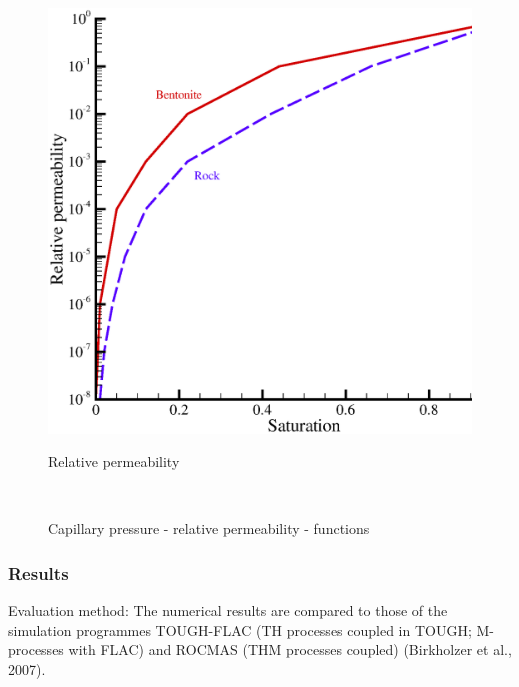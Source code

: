 \begin{figure}[!htb]
\begin{center}
\begin{minipage}[t]{0.45\textwidth}
\begin{center}
        \includegraphics[scale=0.3]{THM/persat.eps}\\
        \centerline{Relative permeability}
      \end{center}
    \end{minipage}\\
  \end{center}
  \caption{Capillary pressure - relative permeability - functions}
  \label{fig:cp_rp}
\end{figure}

\subsubsection*{Results}

Evaluation method: The numerical results are compared to those of the simulation programmes TOUGH-FLAC (TH processes coupled in TOUGH; M-processes with FLAC) and ROCMAS (THM processes coupled) (Birkholzer et al., 2007).


